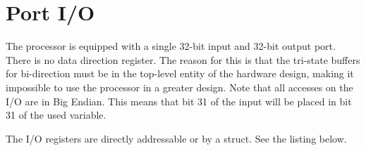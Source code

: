 \documentclass[12pt]{article}
\begin{document}

\appendix
\section{Port I/O}
The processor is equipped with a single 32-bit input and 32-bit output port. There is no data direction register. The reason for this is that the tri-state buffers for bi-direction must be in the top-level entity of the hardware design, making it impossible to use the processor in a greater design. Note that all accesses on the I/O are in Big Endian. This means that bit 31 of the input will be placed in bit 31 of the used variable.

The I/O registers are directly addressable or by a struct. See the listing below.
\end{document}
